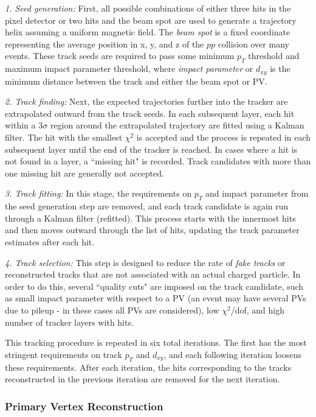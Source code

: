 \noindent\emph{1. Seed generation:} First, all possible combinations of either three hits in the pixel detector or two hits and the beam spot are used to generate a trajectory helix assuming a uniform magnetic field. The \textit{beam spot} is a fixed coordinate representing the average position in x, y, and z of the $pp$ collision over many events. These track seeds are required to pass some minimum $p_T$ threshold and maximum impact parameter threshold, where \textit{impact parameter} or $d_{xy}$ is the minimum distance between the track and either the beam spot or PV.


\noindent\emph{2. Track finding:} Next, the expected trajectories further into the tracker are extrapolated outward from the track seeds. In each subsequent layer, each hit within a $3\sigma$ region around the extrapolated trajectory are fitted using a Kalman filter\cite{Kalman}. The hit with the smallest $\chi^2$ is accepted and the process is repeated in each subsequent layer until the end of the tracker is reached. In cases where a hit is not found in a layer, a ``missing hit" is recorded. Track candidates with more than one missing hit are generally not accepted.


\noindent\emph{3. Track fitting:} In this stage, the requirements on $p_T$ and impact parameter from the seed generation step are removed, and each track candidate is again run through a Kalman filter (refitted). This process starts with the innermost hits and then moves outward through the list of hits, updating the track parameter estimates after each hit.


\noindent\emph{4. Track selection:} This step is designed to reduce the rate of \textit{fake tracks} or reconstructed tracks that are not associated with an actual charged particle. In order to do this, several ``quality cuts" are imposed on the track candidate, such as small impact parameter with respect to a PV (an event may have several PVs due to pileup - in these cases all PVs are considered), low $\chi^2$/dof, and high number of tracker layers with hits.


This tracking procedure is repeated in six total iterations. The first has the most stringent requirements on track $p_T$ and $d_{xy}$, and each following iteration loosens these requirements. After each iteration, the hits corresponding to the tracks reconstructed in the previous iteration are removed for the next iteration.

\subsubsection{Primary Vertex Reconstruction}\label{sec:Vertexing}

